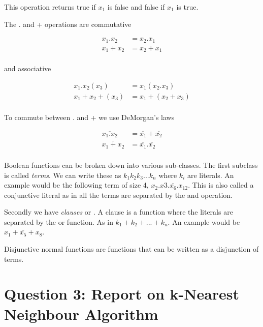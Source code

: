 \documentclass[10pt,a4paper]{article}
\begin{document}
This operation returns true if $x_1$ is false and false if $x_1$ is true.

The . and + operations are commutative 

\begin{equation}
\begin{split}
x_1.x_2 &= x_2.x_1 \\
x_1+x_2 &= x_2 + x_1 \\
\end{split}
\end{equation}

and associative

\begin{equation}
\begin{split}
x_1.x_2(x_3) &= x_1(x_2.x_3) \\
x_1 + x_2 + ( x_3 ) &= x_1 + ( x_2 + x_3 ) \\
\end{split}
\end{equation}

To commute between . and + we use DeMorgan's laws

\begin{equation}
\begin{split}
\overline{x_1.x_2} &= \overline{x_1} + \overline{x_2} \\
\overline{x_1 + x_2} &= \overline{x_1}.\overline{x_2} \\
\end{split}
\end{equation}

Boolean functions can be broken down into various sub-classes. The first subclass is called \emph{terms}. We can write these as $k_1k_2k_3...k_n$ where $k_i$ are literals. An example would be the following term of size 4, $x_2.x3.\overline{x_6}.x_{12}$. This is also called a conjunctive literal as in all the terms  are separated by the and operation.

Secondly we have \emph{clauses} or . A clause is a function where the literals are separated by the or function. As in $k_1+k_2 + ... + k_n $. An example would be $x_1 + \overline{x_5} + x_8$.

Disjunctive normal functions are functions that can be written as a disjunction of terms. 








\section{Question 3: Report on k-Nearest Neighbour Algorithm}
\end{document}
